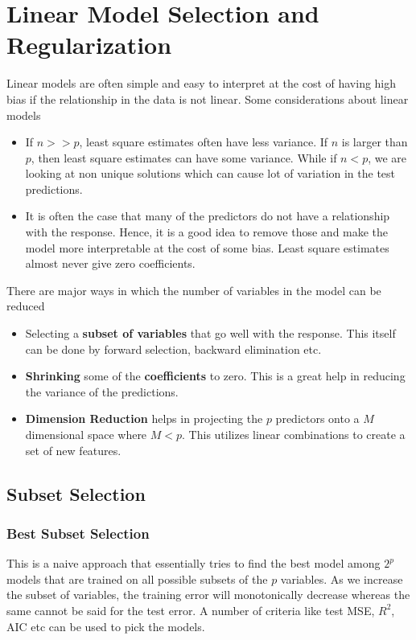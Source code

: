 \documentclass[11pt, a4paper]{article}
\begin{document}
    \section{Linear Model Selection and Regularization}
    Linear models are often simple and easy to interpret at the cost of having high bias if the relationship in the data is not linear. Some considerations about linear models
    \begin{itemize}
        \item If $n >> p$, least square estimates often have less variance. If $n$ is larger than $p$, then least square estimates can have some variance. While if $n < p$, we are looking at non unique solutions which can cause lot of variation in the test predictions.
        \item It is often the case that many of the predictors do not have a relationship with the response. Hence, it is a good idea to remove those and make the model more interpretable at the cost of some bias. Least square estimates almost never give zero coefficients.
    \end{itemize}

    There are major ways in which the number of variables in the model can be reduced
    \begin{itemize}
        \item Selecting a \textbf{subset of variables} that go well with the response. This itself can be done by forward selection, backward elimination etc.
        \item \textbf{Shrinking} some of the \textbf{coefficients} to zero. This is a great help in reducing the variance of the predictions.
        \item \textbf{Dimension Reduction} helps in projecting the $p$ predictors onto a $M$ dimensional space where $M < p$. This utilizes linear combinations to create a set of new features.
    \end{itemize}

    \subsection{Subset Selection}
    \subsubsection{Best Subset Selection}
    This is a naive approach that essentially tries to find the best model among $2^{p}$ models that are trained on all possible subsets of the $p$ variables. As we increase the subset of variables, the training error will monotonically decrease whereas the same cannot be said for the test error. A number of criteria like test MSE, $R^{2}$, AIC etc can be used to pick the models.\newline
\end{document}
